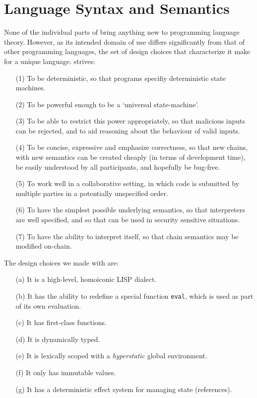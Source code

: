 \section{Language Syntax and Semantics}
\label{s:language}

None of the individual parts of \rad{} bring anything
new to programming language theory. However, as its intended domain of use
differs significantly from that of other programming languages, the set of
design choices that characterize it make for a unique language. \rad{} strives:
\begin{itemize}
\item[(1)] To be deterministic, so that \rad{} programs specifiy deterministic
  state machines.
\item[(2)] To be powerful enough to be a `universal state-machine'.
\item[(3)] To be able to restrict this power appropriately, so that malicious
  inputs can be rejected, and to aid reasoning about the behaviour of valid
  inputs.
\item[(4)] To be concise, expressive and emphasize correctness, so that new
  chains, with new semantics can be created cheaply (in terms of development
  time), be easily understood by all participants, and hopefully be bug-free.
\item[(5)] To work well in a collaborative setting, in which code is submitted
  by multiple parties in a potentially unspecified order.
\item[(6)] To have the simplest possible underlying semantics, so
  that \rad{} interpreters are well specified, and so that \rad{} can be used in
  security sensitive situations.
\item[(7)] To have the ability to interpret itself, so that chain semantics may
  be modified on-chain.
\end{itemize}

The design choices we made with \rad{} are:
\begin{itemize}
\item[(a)] It is a high-level, homoiconic LISP dialect.
\item[(b)] It has the ability to redefine a special function \texttt{eval}, which
  is used as part of its own evaluation.
\item[(c)] It has first-class functions.
\item[(d)] It is dynamically typed.
\item[(e)] It is lexically scoped with a \emph{hyperstatic} global environment.
\item[(f)] It only has immutable values.
\item[(g)] It has a deterministic effect system for managing state (references).
\end{itemize}


